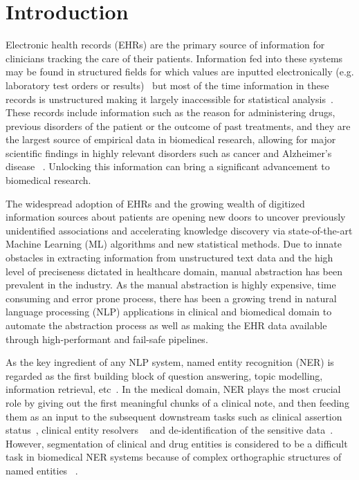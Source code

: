 \documentclass[a4paper,conference]{IEEEtran}
\begin{document}
\section{Introduction}
\label{sec:introduction}

Electronic health records (EHRs) are the primary source of information for clinicians tracking the care of their patients. Information fed into these systems may be found in structured fields for which values are inputted electronically (e.g. laboratory test orders or results)~\cite{liede2015validation} but most of the time information in these records is unstructured making it largely
inaccessible for statistical analysis~\cite{murdoch2013inevitable}. These records include information such as the reason for administering drugs, previous disorders of the patient or the outcome of past treatments, and they are the largest source of empirical data in biomedical research, allowing for major scientific findings in highly relevant disorders such as cancer and Alzheimer’s disease ~\cite{perera2014factors}. Unlocking this information can bring a significant advancement to biomedical research.

The widespread adoption of EHRs and the growing wealth of digitized information sources about patients are opening new doors to uncover previously unidentified associations and accelerating knowledge discovery via state-of-the-art Machine Learning (ML) algorithms and new statistical methods. Due to innate obstacles in extracting information from unstructured text data and the high level of preciseness dictated in healthcare domain, manual abstraction has been prevalent in the industry. As the manual abstraction is highly expensive, time consuming and error prone process, there has been a growing trend in natural language processing (NLP) applications in clinical and biomedical domain to automate the abstraction process as well as making the EHR data available through high-performant and fail-safe pipelines. 

As the  key ingredient of any NLP system, named entity recognition (NER) is regarded as the first building block of question answering, topic modelling, information retrieval, etc~\cite{yadav2019survey}.  In the medical domain, NER plays the most crucial role by giving out the first meaningful chunks of a clinical note, and then feeding them as an input to the subsequent downstream tasks such as clinical assertion status~\cite{uzuner20112010}, clinical entity resolvers ~\cite{tzitzivacos2007international} and de-identification of the sensitive data~\cite{uzuner2007evaluating}. However, segmentation of clinical and drug entities is considered to be a difficult task in biomedical NER systems because of complex orthographic structures of named entities ~\cite{liu2015effects}.
\end{document}

